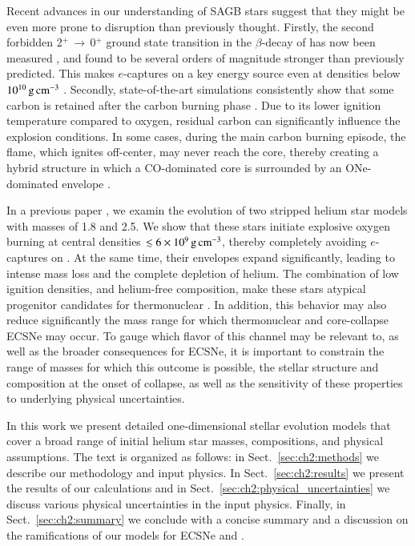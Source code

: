 \documentclass[main.tex]{subfiles}
\begin{document}
Recent advances in our understanding of SAGB stars suggest that they might be even more prone to disruption than previously thought. Firstly, the second forbidden 2$^{+}$\,$\rightarrow$\,0$^{+}$ 
ground state transition in the $\beta$-decay of  has now been measured \citep{kirsebom2019b}, and found to be several orders of magnitude stronger than previously predicted. This makes $e$-captures on  a key energy source even at densities below  $10^{10}\mathrm{\,g\,cm^{-3}}$ \citep{kirsebom2019a,kirsebom2019b,Leung:2019phz}. Secondly, state-of-the-art simulations consistently show that some carbon is retained after the carbon burning phase \citep[][see also Sect.~\ref{sec:ch2:results}]{Iben:1983ts,Garcia1997,siess2006,Denissenkov:2013qaa,Farmer:2015afs,doherty2015,Lecoanet:2016abca,Jones:2018ule}. Due to its lower ignition temperature compared to oxygen, residual carbon can significantly 
influence  the explosion conditions. In some cases, during the main carbon burning episode, the flame, which ignites off-center, may  never reach the core, thereby creating a hybrid structure in which a CO-dominated core is surrounded by an 
ONe-dominated envelope \citep[][and references therein]{Denissenkov:2013qaa,Farmer:2015afs}. 

In a previous paper \citep[][henceforth ]{antoniadis2020}, we examin the evolution of two stripped helium star models with masses of 1.8 and 2.5\msun. We show that these stars initiate explosive oxygen burning at central densities $\lesssim 6\times 10^9\mathrm{\,g\,cm^{-3}}$, thereby completely avoiding  $e$-captures on . At the same time, their envelopes expand significantly, leading to intense mass loss and the complete depletion of helium. The combination of low ignition densities, and helium-free composition, make these stars atypical progenitor candidates for thermonuclear  \ias \citep[henceforth (C)ONe \ias; see also][]{waldman2006a, waldman2008}. In addition, this behavior may also reduce significantly the mass range for which thermonuclear and core-collapse ECSNe may occur. To gauge  which flavor of \ia this channel may be relevant to, as well as the broader consequences for ECSNe, it is important to constrain the range of masses for which this outcome is possible, the  stellar structure and composition at the onset of collapse, as well as the sensitivity of these properties to underlying physical uncertainties. 

In this work we present detailed one-dimensional stellar evolution models that cover a broad range of initial helium star  masses, compositions, and physical assumptions. The text is organized as follows: in Sect.~\ref{sec:ch2:methods} we describe our methodology and input physics. In Sect.~\ref{sec:ch2:results} we present the results of our calculations and in Sect.~\ref{sec:ch2:physical_uncertainties} we discuss various physical uncertainties in the input physics. Finally, in Sect.~\ref{sec:ch2:summary} we conclude with a concise summary and a discussion on the ramifications of our models for ECSNe and \ias. 
\end{document}
